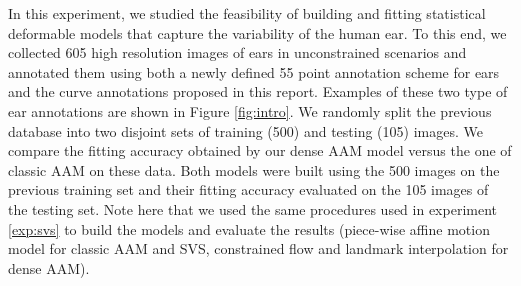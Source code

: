 In this experiment, we studied the feasibility of building and fitting statistical deformable models that capture the variability of the human ear. To this end, we collected 605 high resolution images of ears in unconstrained scenarios and annotated them using both a newly defined 55 point annotation scheme for ears and the curve annotations proposed in this report. Examples of these two type of ear annotations are shown in Figure \ref{fig:intro}. We randomly split the previous database into two disjoint sets of training (500) and testing (105) images. We compare the fitting accuracy obtained by our dense AAM model versus the one of classic AAM on these data. Both models were built using the 500 images on the previous training set and their fitting accuracy evaluated on the 105 images of the testing set. Note here that we used the same procedures used in experiment \ref{exp:svs} to build the models and evaluate the results (piece-wise affine motion model for classic AAM and SVS, constrained flow and landmark interpolation for dense AAM).

